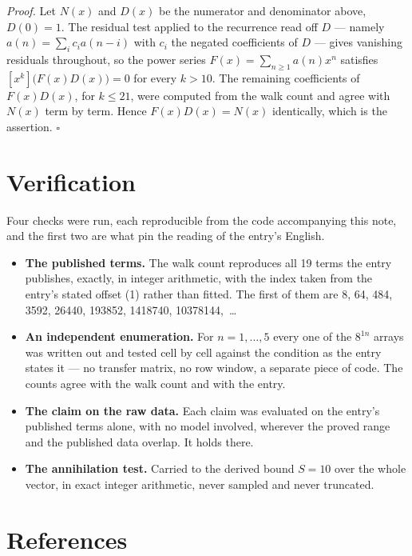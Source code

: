 \documentclass[11pt]{article}
\theoremstyle{definition}
\begin{document}
{\itshape Proof.} Let $N(x)$ and $D(x)$ be the numerator and denominator above, $D(0)=1$. The residual test applied to the recurrence read off $D$ --- namely $a(n) = \sum_i c_i a(n-i)$ with $c_i$ the negated coefficients of $D$ --- gives vanishing residuals throughout, so the power series $F(x)=\sum_{n\ge 1}a(n)x^n$ satisfies $[x^k]\bigl(F(x)D(x)\bigr) = 0$ for every $k > 10$. The remaining coefficients of $F(x)D(x)$, for $k \le 21$, were computed from the walk count and agree with $N(x)$ term by term. Hence $F(x)D(x) = N(x)$ identically, which is the assertion. $\square$

\section{Verification}

Four checks were run, each reproducible from the code accompanying this note, and the first two are what pin the reading of the entry's English.

\begin{itemize}

\item {\bfseries The published terms.} The walk count reproduces all 19 terms the entry publishes, exactly, in integer arithmetic, with the index taken from the entry's stated offset (1) rather than fitted. The first of them are 8, 64, 484, 3592, 26440, 193852, 1418740, 10378144,~\dots

\item {\bfseries An independent enumeration.} For $n = 1,\dots,5$ every one of the $8^{1n}$ arrays was written out and tested cell by cell against the condition as the entry states it --- no transfer matrix, no row window, a separate piece of code. The counts agree with the walk count and with the entry.

\item {\bfseries The claim on the raw data.} Each claim was evaluated on the entry's published terms alone, with no model involved, wherever the proved range and the published data overlap. It holds there.

\item {\bfseries The annihilation test.} Carried to the derived bound $S = 10$ over the whole vector, in exact integer arithmetic, never sampled and never truncated.

\end{itemize}

\section{References}
\end{document}
